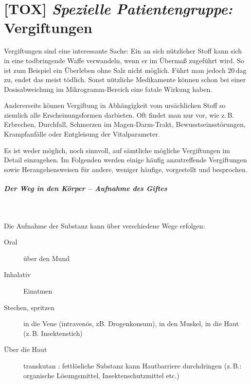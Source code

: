 \chapter{[TOX] \emph{Spezielle Patientengruppe:} Vergiftungen}
\minitoc
\label{topic:vergiftung}



Vergiftungen sind eine interessante Sache: Ein an sich
nützlicher Stoff kann sich in eine todbringende Waffe
verwandeln, wenn er im Übermaß zugeführt wird. So ist zum
Beispiel ein Überleben ohne Salz nicht möglich. Führt man
jedoch 20\,dag zu, endet das meist tödlich. Sonst nützliche
Medikamente können schon bei einer Dosisabweichung im
Mikrogramm-Bereich eine fatale Wirkung haben.

Andererseits können Vergiftung in Abhängigkeit vom ursächlichen Stoff so
ziemlich alle Erscheinungsformen darbieten. Oft findet man
nur  vor, wie z.\,B. Erbrechen,
Durchfall, Schmerzen im Magen-Darm-Trakt,
Bewusstseinsstörungen, Krampfanfälle oder Entgleisung der
Vitalparameter.

Es ist weder möglich, noch sinnvoll, auf sämtliche mögliche
Vergiftungen im Detail einzugehen. Im Folgenden werden
einige häufig anzutreffende Vergiftungen sowie
Herangehensweisen für andere, weniger häufige, vorgestellt
und besprochen. 






\paragraph{Der Weg in den Körper -- Aufnahme des Giftes}~

Die Aufnahme der Substanz kann über verschiedene Wege
erfolgen:

\begin{description}
  \item[Oral] über den Mund
  \item[Inhalativ] Einatmen
  \item[Stechen, spritzen] in die Vene (intravenös, zB.
  Drogenkonsum), in den Muskel, in die %
  Haut (z.\,B. Insektenstich)
  \item[Über die Haut] transkutan : fettlösliche Substanz kann  Hautbarriere durchdringen
  (z.\,B.:  organische Lösungsmittel,  Insektenschutzmittel etc.)
\end{description}




